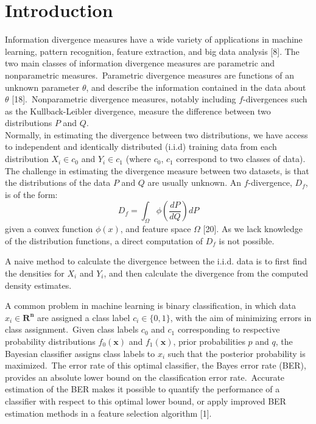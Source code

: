 \documentclass{article}
\begin{document}
	\section{Introduction} 
	\indent Information divergence measures have a wide variety of applications in machine learning, pattern recognition, feature extraction, and big data analysis [8]. The two main classes of information divergence measures are parametric and nonparametric measures.\ Parametric divergence measures are functions of an unknown parameter $\theta$, and describe the information contained in the data about $\theta$ [18].\ Nonparametric divergence measures, notably including $f$-divergences such as the Kullback-Leibler divergence,  measure the difference between two distributions $P$ and $Q$.\ 
	\\ [0.5ex] 
	\indent Normally, in estimating the divergence between two distributions, we have access to independent and identically distributed (i.i.d) training data from each distribution $X_i \in c_0$ and $Y_i \in c_1$ (where $c_0$, $c_1$ correspond to two classes of data). The challenge in estimating the divergence measure between two datasets, is that the distributions of the data $P$ and $Q$ are usually unknown. An $f$-divergence, $D_f$, is of the form: 	\begin{equation} D_f=\int_{\Omega} \phi(\frac{dP}{dQ})dP \end{equation} given a convex function $\phi(x)$, and feature space $\Omega$ [20].
 	As we lack knowledge of the distribution functions, a direct computation of $D_f$ is not possible.
 	
 	A naive method to calculate the divergence between the i.i.d. data is to first find the densities for $X_i$ and $Y_i$, and then calculate the divergence from the computed density estimates. 
	
	
	A common problem in machine learning is binary classification, in which data $x_i\in \mathbf{R^n}$ are assigned a class label $c_i \in \{0,1\}$, with the aim of minimizing errors in class assignment.\ Given class labels $c_0$ and $c_1$ corresponding to respective probability distributions $f_0(\textbf{x})$ and $f_1(\textbf{x})$, prior probabilities $p$ and $q$, the Bayesian classifier assigns class labels to $x_i$ such that the posterior probability is maximized.\ The error rate of this optimal classifier, the Bayes error rate (BER), provides an absolute lower bound on the classification error rate.\ Accurate estimation of the BER makes it possible to quantify the performance of a classifier with respect to this optimal lower bound, or apply improved BER estimation methods in a feature selection algorithm [1]. 
	
\end{document}
